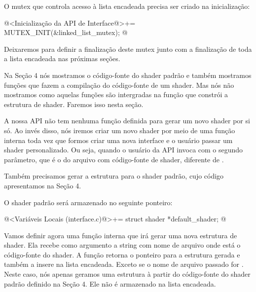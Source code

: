 O mutex que controla acesso à lista encadeada precisa ser criado na
inicialização:

\iniciocodigo
@<Inicialização da API de Interface@>+=
MUTEX_INIT(&linked_list_mutex);
@
\fimcodigo

Deixaremos para definir a finalização deste mutex junto com a
finalização de toda a lista encadeada nas próximas seções.


Na Seção 4 nós mostramos o código-fonte do shader padrão e também
mostramos funções que fazem a compilação do código-fonte de um
shader. Mas nós não mostramos como aquelas funções são intergradas na
função que constrói a estrutura de shader. Faremos isso nesta seção.

A nossa API não tem nenhuma função definida para gerar um novo shader
por si só. Ao invés disso, nós iremos criar um novo shader por meio de
uma função interna toda vez que formos criar uma nova interface e o
usuário passar um shader personalizado. Ou seja, quando o usuário da
API invoca  com o segundo parâmetro, que
é o do arquivo com código-fonte de shader, diferente
de .

Também precisamos gerar a estrutura para o shader padrão, cujo código
apresentamos na Seção 4.

O shader padrão será armazenado no seguinte ponteiro:

\iniciocodigo
@<Variáveis Locais (interface.c)@>+=
struct shader *default_shader;
@
\fimcodigo

Vamos definir agora uma função interna que irá gerar uma nova
estrutura de shader. Ela recebe como argumento a string com nome de
arquivo onde está o código-fonte do shader. A função retorna o
ponteiro para a estrutura gerada e também a insere na lista
encadeada. Exceto se o nome de arquivo passado
for . Neste caso, nós apenas geramos uma estrutura à
partir do código-fonte do shader padrão definido na Seção 4. Ele não é
armazenado na lista encadeada.

